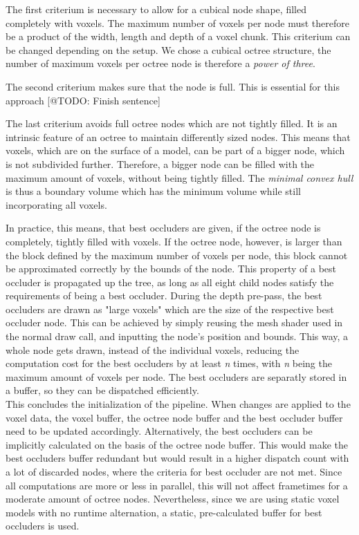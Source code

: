 The first criterium is necessary to allow for a cubical node shape, filled completely with voxels. The maximum number 
of voxels per node must therefore be a product of the width, length and depth of a voxel chunk. This criterium can 
be changed depending on the setup. We chose a cubical octree structure, the number of maximum voxels per octree node 
is therefore a \emph{power of three}.

\noindent
The second criterium makes sure that the node is full. This is essential for this approach [@TODO: Finish sentence]

\noindent
The last criterium avoids full octree nodes which are not tightly filled. It is an intrinsic feature of an octree 
to maintain differently sized nodes. This means that voxels, which are on the surface of a model, can be part of 
a bigger node, which is not subdivided further. Therefore, a bigger node can be filled with the maximum amount of 
voxels, without being tightly filled. The \emph{minimal convex hull} is thus a boundary volume which has the minimum 
volume while still incorporating all voxels.

\noindent
In practice, this means, that best occluders are given, if the octree node is completely, tightly filled 
with voxels. If the octree node, however, is larger than the block defined by the maximum number of voxels 
per node, this block cannot be approximated correctly by the bounds of the node. This property of a best 
occluder is propagated up the tree, as long as all eight child nodes satisfy the requirements of being a 
best occluder. During the depth pre-pass, the best occluders are drawn as "large voxels" which are the size 
of the respective best occluder node. This can be achieved by simply reusing the mesh shader used in the 
normal draw call, and inputting the node's position and bounds. This way, a whole node gets drawn, instead 
of the individual voxels, reducing the computation cost for the best occluders by at least \emph{n} times, 
with \emph{n} being the maximum amount of voxels per node. The best occluders are separatly stored in a 
buffer, so they can be dispatched efficiently. \\


\noindent
This concludes the initialization of the pipeline. When changes are applied to the voxel data, the voxel buffer,
the octree node buffer and the best occluder buffer need to be updated accordingly. Alternatively, the best 
occluders can be implicitly calculated on the basis of the octree node buffer. This would make the best 
occluders buffer redundant but would result in a higher dispatch count with a lot of discarded nodes, 
where the criteria for best occluder are not met. Since all computations are more or less in parallel, this 
will not affect frametimes for a moderate amount of octree nodes. Nevertheless, since we are using static 
voxel models with no runtime alternation, a static, pre-calculated buffer for best occluders is used.


